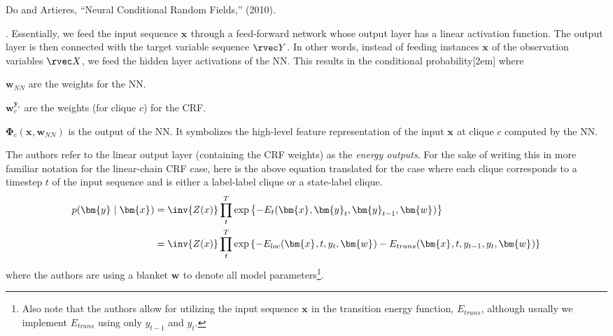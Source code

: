 \documentclass[11pt]{article}
\renewcommand\vec[2][]{\bm{#2}_{#1}}
\newcommand\p{\Needspace{10\baselineskip} \noindent}
\begin{document}
\vspace{-1em}
{\footnotesize Do and Artieres, ``Neural Conditional Random Fields,'' (2010).}


\p {}. Essentially, we feed the input sequence $\vec x$ through a feed-forward network whose output layer has a linear activation function. The output layer is then connected with the target variable sequence $\rvec Y$. In other words, instead of feeding instances $\vec x$ of the observation variables $\rvec X$, we feed the hidden layer activations of the NN. This results in the conditional probability[2em]
\graybox{
	p(\vec y \mid \vec x) &\propto \prod_{c \in C} e^{-E_c(\vec x, \vec[c]{y}, \vec w) }
	= \prod_{c \in C} e^{  \langle \vec[c]{w}^{\vec[c]{y}}, \vec[c]{\Phi}(\vec x, \vec[NN]{w})   \rangle   }
}
where
\begin{compactitem}
	\item $\vec[NN]{w}$ are the weights for the NN. 
	\item $\vec[c]{w}^{\vec[c]{y}}$ are the weights (for clique $c$) for the CRF. 
	\item $ \vec[c]{\Phi}(\vec x, \vec[NN]{w}) $ is the output of the NN. It symbolizes the high-level feature representation of the input $\vec x$ at clique $c$ computed by the NN. 
\end{compactitem}
The authors refer to the linear output layer (containing the CRF weights) as the \textit{energy outputs}. For the sake of writing this in more familiar notation for the linear-chain CRF case, here is the above equation translated for the case where  each clique corresponds to a timestep $t$ of the input sequence and is either a label-label clique or a state-label clique. 
\begin{align}
p(\vec y \mid \vec x) &= \inv{Z(x)} \prod_t^T \exp\left\{ - E_t(\vec x, \vec[t]{y}, \vec[t-1]{y}, \vec w) \right\} \\
	&= \inv{Z(x)} \prod_t^T \exp\left\{ -E_{loc}(\vec x, t, y_t, \vec w) - E_{trans}(\vec x, t, y_{t-1}, y_t, \vec w)  \right\} \\
\end{align}
where the authors are using a blanket $\vec w$ to denote all model parameters\footnote{Also note that the authors allow for utilizing the input sequence $\vec x$ in the transition energy function, $E_{trans}$, although usually we implement $E_{trans}$ using only $y_{t-1}$ and $y_{t}$.}.
\end{document}
